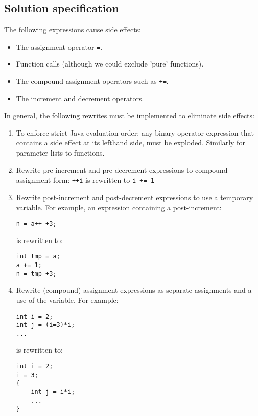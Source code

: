 \documentclass{article}
\begin{document}
\subsection{Solution specification}
The following expressions cause side effects:
\begin{itemize}
\item The assignment operator \verb'='.
\item Function calls (although we could exclude 'pure' functions).
\item The compound-assignment operators such as \verb'+='.
\item The increment and decrement operators.
\end{itemize}
In general, the following rewrites must be implemented to eliminate
side effects:
\begin{enumerate}
\item
To enforce strict Java evaluation order: any binary operator
expression that contains a side effect at its lefthand side, must be
exploded. Similarly for parameter lists to functions.
\item Rewrite pre-increment and pre-decrement expressions to compound-assignment
      form: \verb'++i' is rewritten to \verb'i += 1'
\item Rewrite post-increment and post-decrement expressions to use a
      temporary variable. For example, an expression containing a
      post-increment:
\begin{verbatim}
n = a++ +3;
\end{verbatim}
is rewritten to:
\begin{verbatim}
int tmp = a;
a += 1;
n = tmp +3;
\end{verbatim}
\item Rewrite (compound) assignment expressions as separate
      assignments and a use of the variable. For example:
\begin{verbatim}
int i = 2;
int j = (i=3)*i;
...
\end{verbatim}
is rewritten to:
\begin{verbatim}
int i = 2;
i = 3;
{
    int j = i*i;
    ...
}
\end{verbatim}
\end{enumerate}
\end{document}
